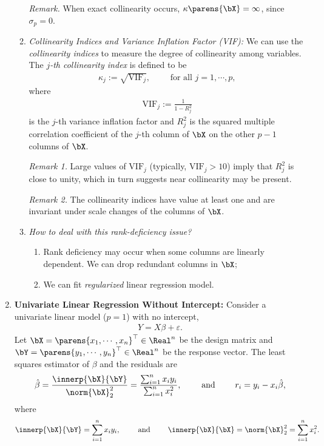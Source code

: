\documentclass[12pt]{article}
\begin{document}
\begin{enumerate}[label=\textbf{\arabic*.}]
\begin{enumerate}
		\textit{Remark.} When exact collinearity occurs, $\kappa \parens{\bX} = \infty$, since $\sigma_p = 0$. 
		
		\item \textit{Collinearity Indices and Variance Inflation Factor (VIF):} We can use the \emph{collinearity indices} to measure the degree of collinearity among variables. The \emph{$j$-th collinearity index} is defined to be 
		\begin{align*}
			\kappa_j := \sqrt{\mathrm{VIF}_j}, \qquad \text{ for all } j = 1, \cdots, p, 
		\end{align*}
		where 
		\begin{align}
			\mathrm{VIF}_j := \frac{1}{1 - R_j^2}
		\end{align}
		is the $j$-th variance inflation factor and $R_j^2$ is the squared multiple correlation coefficient of the $j$-th column of $\bX$ on the other $p-1$ columns of $\bX$. 
		
		\textit{Remark 1.} Large values of $\mathrm{VIF}_j$ (typically, $\mathrm{VIF}_j > 10$) imply that $R_j^2$ is close to unity, which in turn suggests near collinearity may be present. 
		
		\textit{Remark 2.} The collinearity indices have value at least one and are invariant under scale changes of the columns of $\bX$. 
		
		\item \textit{How to deal with this rank-deficiency issue?}
		\begin{enumerate}
			\item Rank deficiency may occur when some columns are linearly dependent. We can drop redundant columns in $\bX$; 
			\item We can fit \emph{regularized} linear regression model. 
		\end{enumerate}
	\end{enumerate}
	
	\item \textbf{Univariate Linear Regression Without Intercept:} Consider a univariate linear model ($p=1$) with no intercept, 
	\begin{align*}
		Y = X \beta + \varepsilon. 
	\end{align*}
	Let $\bX = \parens{x_1, \cdots, x_n}^\top \in \Real^n$ be the design matrix and $\bY = \parens{y_1, \cdots, y_n}^\top \in \Real^n$ be the response vector. The least squares estimator of $\beta$ and the residuals are 
	\begin{align*}
		\hat{\beta} = \frac{\innerp{\bX}{\bY}}{\norm{\bX}_2^2} = \frac{\sum_{i=1}^n x_i y_i}{\sum_{i=1}^n x_i^2}, \qquad \text{ and } \qquad r_i = y_i - x_i \hat{\beta}, 
	\end{align*}
	where 
	\begin{align*}
		\innerp{\bX}{\bY} = \sum_{i=1}^n x_i y_i, \qquad \text{ and } \qquad \innerp{\bX}{\bX} = \norm{\bX}_2^2 = \sum_{i=1}^n x_i^2. 
	\end{align*}
	

\end{enumerate}
\end{document}
